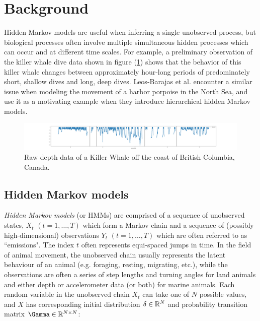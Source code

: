 
\section{Background}

Hidden Markov models are useful when inferring a single unobserved process, but biological processes often involve multiple simultaneous hidden processes which can occur and at different time scales. For example, a preliminary observation of the killer whale dive data shown in figure (\ref{fig:data}) shows that the behavior of this killer whale changes between approximately hour-long periods of predominately short, shallow dives and long, deep dives. Leos-Barajas et al. encounter a similar issue when modeling the movement of a harbor porpoise in the North Sea, and use it as a motivating example when they introduce hierarchical hidden Markov models.

\begin{figure}[h!]
	\centering
	\includegraphics[width=6.5in]{../Plots/raw_data.png}
	\caption{Raw depth data of a Killer Whale off the coast of British Columbia, Canada.}
	\label{fig:data}
\end{figure}

\subsection{Hidden Markov models}
\label{subsection:HMMs}

\textit{Hidden Markov models} (or HMMs) are comprised of a sequence of unobserved states, $X_t$ $(t = 1, \ldots, T)$ which form a Markov chain and a sequence of (possibly high-dimensional) observations $Y_t$ $(t = 1, \ldots, T)$ which are often referred to as ``emissions". The index $t$ often represents equi-spaced jumps in time. In the field of animal movement, the unobserved chain usually represents the latent behaviour of an animal (e.g. foraging, resting, migrating, etc.), while the observations are often a series of step lengths and turning angles for land animals and either depth or accelerometer data (or both) for marine animals. Each random variable in the unobserved chain $X_t$ can take one of $N$ possible values, and $X$ has corresponding initial distribution $\delta \in \mathbb{R}^N$ and probability transition matrix $\Gamma \in \bbR^{N \times N}$:

